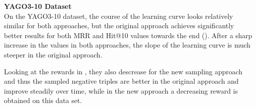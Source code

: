 \textbf{YAGO3-10 Dataset}
\label{subsubsec:uncertainty_yago3_10}\\
%
On the \textsc{YAGO3-10} dataset, the course of the learning curve looks relatively similar for both approaches, but the original approach achieves significantly better results for both MRR and Hit@10 values towards the end ().
After a sharp increase in the values in both approaches, the slope of the learning curve is much steeper in the original \kbgan approach.

Looking at the rewards in , they also descrease for the new sampling approach and thus the sampled negative triples are better in the original approach and improve steadily over time, while in the new approach a decreasing reward is obtained on this data set.
\clearpage
